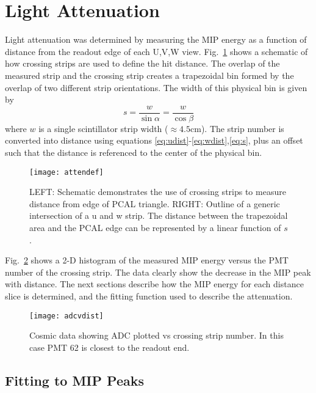 \section{Light Attenuation}

Light attenuation was determined by measuring the MIP energy as a function of distance from the readout edge of each U,V,W view.  Fig.~\ref{fig:attendef} shows a schematic of how crossing strips are used to define the hit distance. The overlap of the measured strip and the crossing strip creates a trapezoidal bin formed by the overlap of two different strip orientations. The width of this physical bin is given by
\begin{equation}
    s = \frac{w}{\sin{\alpha}} = \frac{w}{\cos{\beta}}
    \label{eq:s}
\end{equation}
where $w$ is a single scintillator strip width ($\approx 4.5$cm). The strip number is converted into distance using equations \ref{eq:udist}-\ref{eq:wdist},\ref{eq:s}, plus an offset such that the distance is referenced to the center of the physical bin. 

\begin{figure}[h]
\centering
\texttt{[image: attendef]}
\caption{LEFT: Schematic demonstrates the use of crossing strips to measure distance from edge of PCAL triangle. RIGHT: Outline of a generic intersection of a u and w strip. The distance between the trapezoidal
 area and the PCAL edge can be represented by a linear function of $s$.}
\label{fig:attendef}
\end{figure}

Fig.~\ref{fig:adcvdist} shows a 2-D histogram of the measured MIP energy versus the PMT number of the crossing strip.  The data clearly show the decrease in the MIP peak with distance. The next sections describe how the MIP energy for each distance slice is determined, and the fitting function used to describe the attenuation.

\begin{figure}[h]
\centering
\texttt{[image: adcvdist]}
\caption{Cosmic data showing ADC plotted vs crossing strip number.  In this case PMT 62 is closest to the readout end.}
\label{fig:adcvdist}
\end{figure}

\subsection{Fitting to MIP Peaks}
\label{Sec:fitToADCOutput}

